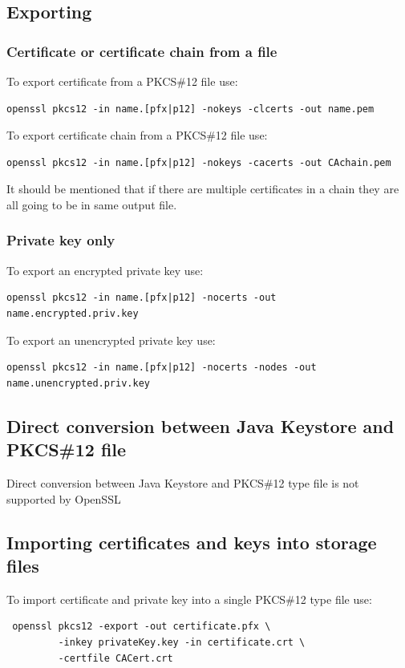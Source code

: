 \documentclass[10pt, a4paper]{report}
\begin{document}
  \subsection{Exporting}
  
    \subsubsection{Certificate or certificate chain from a file}
    To export certificate from a PKCS\#12 file use:
\begin{verbatim}
openssl pkcs12 -in name.[pfx|p12] -nokeys -clcerts -out name.pem
\end{verbatim}

    To export certificate chain from a PKCS\#12 file use:
\begin{verbatim}
openssl pkcs12 -in name.[pfx|p12] -nokeys -cacerts -out CAchain.pem
\end{verbatim}
    It should be mentioned that if there are multiple certificates in a chain they are all going to be in same output file.

    \subsubsection{Private key only}
    To export an encrypted private key use:
\begin{verbatim}
openssl pkcs12 -in name.[pfx|p12] -nocerts -out name.encrypted.priv.key
\end{verbatim}

    To export an unencrypted private key use:
\begin{verbatim}
openssl pkcs12 -in name.[pfx|p12] -nocerts -nodes -out name.unencrypted.priv.key
\end{verbatim}


  \subsection{Direct conversion between Java Keystore and PKCS\#12 file}
Direct conversion between Java Keystore and PKCS\#12 type file is not supported by OpenSSL 
  \subsection{Importing certificates and keys into storage files}
To import certificate and private key into a single PKCS\#12 type file use:
\begin{verbatim}
 openssl pkcs12 -export -out certificate.pfx \
         -inkey privateKey.key -in certificate.crt \
         -certfile CACert.crt
\end{verbatim}
\end{document}
